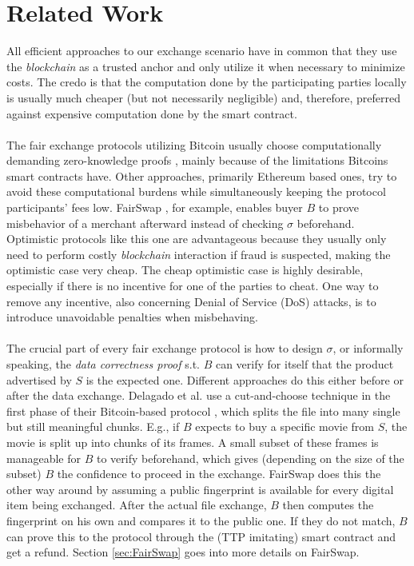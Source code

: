 \documentclass{cacthesis}
\newcounter{protocol}
\begin{document}
        \section{Related Work}
        All efficient approaches to our exchange scenario have in common that they use the \textit{blockchain} as a trusted anchor and only utilize it when necessary to minimize costs. The credo is that the computation done by the participating parties locally is usually much cheaper (but not necessarily negligible) and, therefore, preferred against expensive computation done by the smart contract. \\\\
        The fair exchange protocols utilizing Bitcoin usually choose computationally demanding zero-knowledge proofs \cite{zkcp}\cite{DELGADOSEGURA2020832}, mainly because of the limitations Bitcoins smart contracts have. Other approaches, primarily Ethereum based ones, try to avoid these computational burdens while simultaneously keeping the protocol participants' fees low. FairSwap \cite{10.1145/3243734.3243857}, for example, enables buyer $B$ to prove misbehavior of a merchant afterward instead of checking $\sigma$ beforehand. Optimistic protocols like this one are advantageous because they usually only need to perform costly \textit{blockchain} interaction if fraud is suspected, making the optimistic case very cheap. The cheap optimistic case is highly desirable, especially if there is no incentive for one of the parties to cheat. One way to remove any incentive, also concerning Denial of Service (DoS) attacks, is to introduce unavoidable penalties when misbehaving. \\\\
        The crucial part of every fair exchange protocol is how to design $\sigma$, or informally speaking, the \textit{data correctness proof} s.t. $B$ can verify for itself that the product advertised by $S$ is the expected one. Different approaches do this either before or after the data exchange. Delagado et al. use a cut-and-choose technique in the first phase of their Bitcoin-based protocol \cite{DELGADOSEGURA2020832}, which splits the file into many single but still meaningful chunks. E.g., if $B$ expects to buy a specific movie from $S$, the movie is split up into chunks of its frames. A small subset of these frames is manageable for $B$ to verify beforehand, which gives (depending on the size of the subset) $B$ the confidence to proceed in the exchange. FairSwap does this the other way around by assuming a public fingerprint is available for every digital item being exchanged. After the actual file exchange, $B$ then computes the fingerprint on his own and compares it to the public one. If they do not match, $B$ can prove this to the protocol through the (TTP imitating) smart contract and get a refund. Section \ref{sec:FairSwap} goes into more details on FairSwap.
\end{document}
